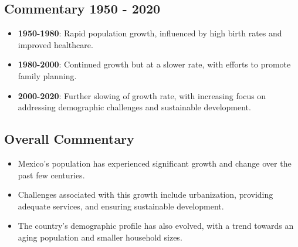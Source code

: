 \subsection*{Commentary 1950 - 2020}
\begin{itemize}
    \item \textbf{1950-1980}: Rapid population growth, influenced by high birth rates and improved healthcare.
    \item \textbf{1980-2000}: Continued growth but at a slower rate, with efforts to promote family planning.
    \item \textbf{2000-2020}: Further slowing of growth rate, with increasing focus on addressing demographic challenges and sustainable development.
\end{itemize}

\subsection*{Overall Commentary}
\begin{itemize}
    \item Mexico’s population has experienced significant growth and change over the past few centuries.
    \item Challenges associated with this growth include urbanization, providing adequate services, and ensuring sustainable development.
    \item The country’s demographic profile has also evolved, with a trend towards an aging population and smaller household sizes.
\end{itemize}
